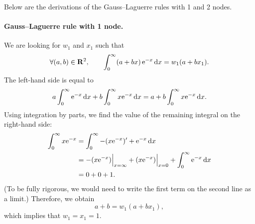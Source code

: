 \begin{solution}
    Below are the derivations of the Gauss--Laguerre rules with 1 and 2 nodes.
    \paragraph{Gauss--Laguerre rule with 1 node.}
    We are looking for $w_1$ and $x_1$ such that
    \[
        \forall (a,b) \in \mathbf R^2, \qquad
        \int_{0}^{\infty} (a + bx) \, \mathrm e^{-x} \, \mathrm d x = w_1 (a + b x_1).
    \]
    The left-hand side is equal to
    \[
        a \int_{0}^{\infty} \mathrm e^{-x} \, \mathrm d x + b \int_{0}^{\infty} x \mathrm e^{-x} \, \mathrm d x
        = a + b \int_{0}^{\infty} x \mathrm e^{-x} \, \mathrm d x.
    \]
    Using integration by parts,
    we find the value of the remaining integral on the right-hand side:
    \begin{align*}
        \int_{0}^{\infty} x \mathrm e^{-x}
        &= \int_{0}^{\infty} - (x \mathrm e^{-x})' + \mathrm e^{-x} \, \mathrm d x \\
        &= - (x \mathrm e^{-x}) \Big\vert_{x={\infty}} + (x \mathrm e^{-x}) \Big\vert_{x={0}} + \int_{0}^{\infty} \mathrm e^{-x} \, \mathrm d x \\
        &= 0 + 0 + 1.
    \end{align*}
    (To be fully rigorous, we would need to write the first term on the second line as a limit.)
    Therefore, we obtain
    \[
        a + b = w_1(a + b x_1),
    \]
    which implies that $w_1 = x_1 = 1$.


\end{solution}
